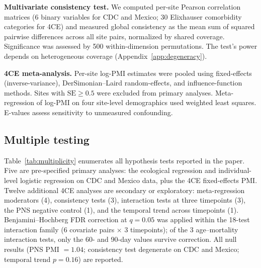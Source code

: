 \documentclass[11pt]{article}
\begin{document}
\textbf{Multivariate consistency test.}  We computed per-site Pearson
correlation matrices (6 binary variables for CDC and Mexico; 30 Elixhauser
comorbidity categories for 4CE) and measured global consistency as the mean
sum of squared pairwise differences across all site pairs, normalized by
shared coverage.  Significance was assessed by 500 within-dimension
permutations.  The test's power depends on heterogeneous coverage
(Appendix~\ref{app:degeneracy}).

\textbf{4CE meta-analysis.}  Per-site log-PMI estimates were pooled using
fixed-effects (inverse-variance), DerSimonian--Laird random-effects, and
influence-function methods.  Sites with $\text{SE} \geq 0.5$ were excluded
from primary analyses.  Meta-regression of log-PMI on four site-level
demographics used weighted least squares.  E-values \cite{vanderweele2017}
assess sensitivity to unmeasured confounding.

\subsection{Multiple testing}

Table~\ref{tab:multiplicity} enumerates all hypothesis tests reported in
the paper.  Five are pre-specified primary analyses: the ecological
regression and individual-level logistic regression on CDC and Mexico data,
plus the 4CE fixed-effects PMI.  Twelve additional 4CE analyses are
secondary or exploratory: meta-regression moderators (4), consistency
tests (3), interaction tests at three timepoints (3), the PNS negative
control (1), and the temporal trend across timepoints (1).
Benjamini--Hochberg FDR correction \cite{benjamini1995fdr} at $q = 0.05$ was applied within
the 18-test interaction family (6 covariate pairs $\times$ 3
timepoints); of the 3 age--mortality interaction tests, only the 60-
and 90-day values survive correction.  All null results (PNS PMI
$= 1.04$; consistency test degenerate on CDC and Mexico; temporal trend
$p = 0.16$) are reported.
\end{document}
